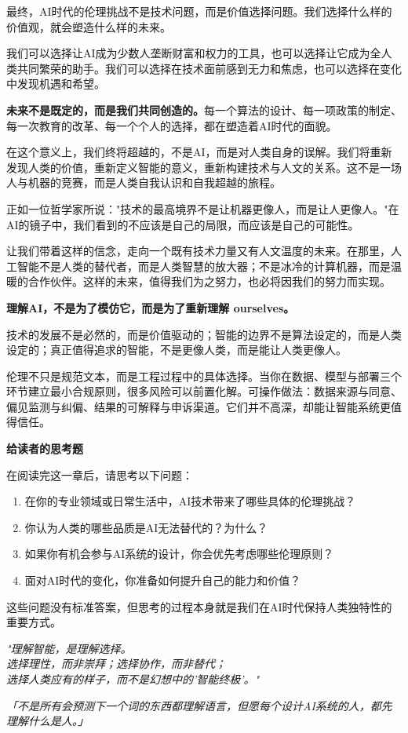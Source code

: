 最终，AI时代的伦理挑战不是技术问题，而是价值选择问题。我们选择什么样的价值观，就会塑造什么样的未来。

我们可以选择让AI成为少数人垄断财富和权力的工具，也可以选择让它成为全人类共同繁荣的助手。我们可以选择在技术面前感到无力和焦虑，也可以选择在变化中发现机遇和希望。

{\bf 未来不是既定的，而是我们共同创造的。}每一个算法的设计、每一项政策的制定、每一次教育的改革、每一个个人的选择，都在塑造着AI时代的面貌。

在这个意义上，我们终将超越的，不是AI，而是对人类自身的误解。我们将重新发现人类的价值，重新定义智能的意义，重新构建技术与人文的关系。这不是一场人与机器的竞赛，而是人类自我认识和自我超越的旅程。

正如一位哲学家所说："技术的最高境界不是让机器更像人，而是让人更像人。"在AI的镜子中，我们看到的不应该是自己的局限，而应该是自己的可能性。

让我们带着这样的信念，走向一个既有技术力量又有人文温度的未来。在那里，人工智能不是人类的替代者，而是人类智慧的放大器；不是冰冷的计算机器，而是温暖的合作伙伴。这样的未来，值得我们为之努力，也必将因我们的努力而实现。

\textbf{理解AI，不是为了模仿它，而是为了重新理解 ourselves。}

技术的发展不是必然的，而是价值驱动的；智能的边界不是算法设定的，而是人类设定的；真正值得追求的智能，不是更像人类，而是能让人类更像人。

伦理不只是规范文本，而是工程过程中的具体选择。当你在数据、模型与部署三个环节建立最小合规原则，很多风险可以前置化解。可操作做法：数据来源与同意、偏见监测与纠偏、结果的可解释与申诉渠道。它们并不高深，却能让智能系统更值得信任。

\begin{hintbox}
{\bf 给读者的思考题}

在阅读完这一章后，请思考以下问题：
\begin{enumerate}
\item 在你的专业领域或日常生活中，AI技术带来了哪些具体的伦理挑战？
\item 你认为人类的哪些品质是AI无法替代的？为什么？
\item 如果你有机会参与AI系统的设计，你会优先考虑哪些伦理原则？
\item 面对AI时代的变化，你准备如何提升自己的能力和价值？
\end{enumerate}

这些问题没有标准答案，但思考的过程本身就是我们在AI时代保持人类独特性的重要方式。
\end{hintbox}

\begin{center}
\textit{
"理解智能，是理解选择。\\
选择理性，而非崇拜；选择协作，而非替代；\\
选择人类应有的样子，而不是幻想中的'智能终极'。"}
\end{center}

\begin{center}
\textit{
「不是所有会预测下一个词的东西都理解语言，但愿每个设计AI系统的人，都先理解什么是人。」
}
\end{center}

\nocite{*}
\newpage
